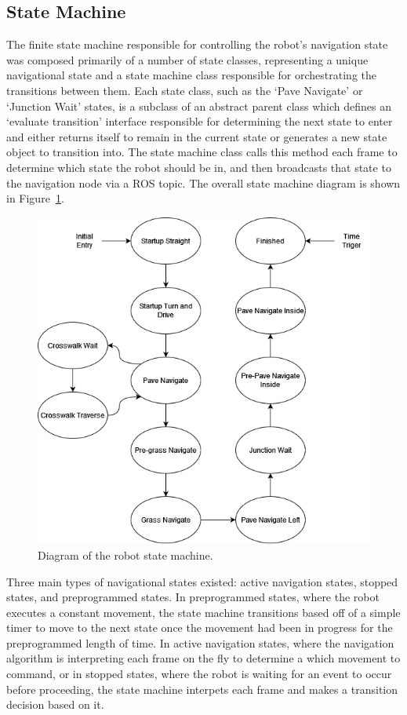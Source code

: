 \documentclass[titlepage, twocolumn]{article}
\begin{document}
    \subsection{State Machine}
        The finite state machine responsible for controlling the robot's navigation state was composed primarily of a number of state classes, representing a unique navigational state and a state machine class responsible for orchestrating the transitions between them. Each state class, such as the `Pave Navigate' or `Junction Wait' states, is a subclass of an abstract parent class which defines an `evaluate transition' interface responsible for determining the next state to enter and either returns itself to remain in the current state or generates a new state object to transition into. The state machine class calls this method each frame to determine which state the robot should be in, and then broadcasts that state to the navigation node via a ROS topic. The overall state machine diagram is shown in Figure~\ref{fig:statemachine}.

        \begin{figure}
            \includegraphics[width=\linewidth]{statemachine.png}
            \caption{Diagram of the robot state machine.}
            \label{fig:statemachine}
        \end{figure}

        Three main types of navigational states existed: active navigation states, stopped states, and preprogrammed states. In preprogrammed states, where the robot executes a constant movement, the state machine transitions based off of a simple timer to move to the next state once the movement had been in progress for the preprogrammed length of time. In active navigation states, where the navigation algorithm is interpreting each frame on the fly to determine a which movement to command, or in stopped states, where the robot is waiting for an event to occur before proceeding, the state machine interpets each frame and makes a transition decision based on it.
\end{document}
